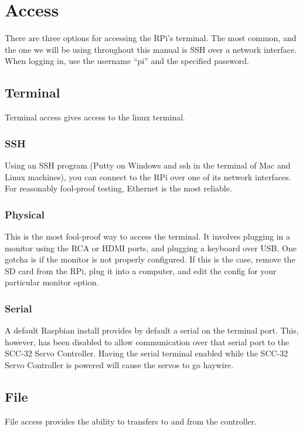	
		\section{Access}
			There are three options for accessing the RPi’s terminal. The most common, and the one we will be using throughout this manual is SSH over a network interface.\\
			
			When logging in, use the username “pi” and the specified password.\\
		
			\subsection{Terminal}
				Terminal access gives access to the linux terminal.
		
			\subsubsection{SSH}
				Using an SSH program (Putty on Windows and ssh in the terminal of Mac and Linux machines), you can connect to the RPi over one of its network interfaces. For reasonably fool-proof testing, Ethernet is the most reliable.
		
				\subsubsection{Physical}
					This is the most fool-proof way to access the terminal. It involves plugging in a monitor using the RCA or HDMI ports, and plugging a keyboard over USB. One gotcha is if the monitor is not properly configured. If this is the case, remove the SD card from the RPi, plug it into a computer, and edit the config for your particular monitor option.
					
				\subsubsection{Serial}
					A default Raspbian install provides by default a serial on the terminal port. This, however, has been disabled to allow communication over that serial port to the SCC-32 Servo Controller. Having the serial terminal enabled while the SCC-32 Servo Controller is powered will cause the servos to go haywire.
					
			\subsection{File}
				File access provides the ability to transfers to and from the controller.
				
